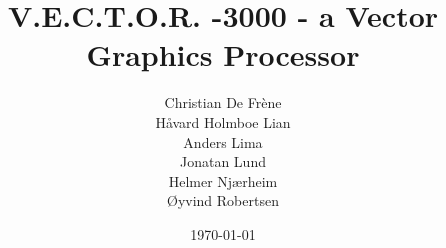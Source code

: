 \newcommand{\mytitle}{V.E.C.T.O.R. -3000 - a Vector Graphics Processor}
\newcommand{\myauthor}{Christian De Frène\\Håvard Holmboe Lian\\Anders Lima\\Jonatan Lund\\Helmer Njærheim\\Øyvind Robertsen\\}

\title{\mytitle}
\author{\myauthor}
\date{\today}
